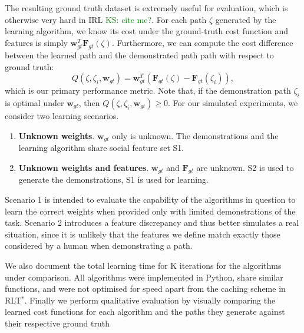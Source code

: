 \documentclass{article}  %
\newcommand{\ks}[1]{\textcolor{green}{KS: #1}}
\begin{document}
	The resulting ground truth dataset is extremely useful for evaluation, which is otherwise very hard in IRL \ks{cite me?}. For each path $\zeta$ generated by the learning algorithm, we know its cost under the ground-truth cost function and features is simply  $\mathbf{w}_{gt}^T\mathbf{F}_{gt}(\zeta)$. Furthermore, we can compute the cost difference between the learned path and the demonstrated path path with respect to ground truth:
	\begin{equation}
		Q(\zeta,\zeta_i,\mathbf{w}_{gt}) = \mathbf{w}_{gt}^T(\mathbf{F}_{gt}(\zeta)-\mathbf{F}_{gt}(\zeta_i)), \label{eq:obj_eval}
	\end{equation}
which is our primary performance metric.  Note that, if the demonstration path $\zeta_i$ is optimal under $\mathbf{w}_{gt}$, then $Q(\zeta,\zeta_i,\mathbf{w}_{gt}) \geq 0$. For our simulated experiments, we consider two learning scenarios.
\begin{enumerate}
	\item \textbf{Unknown weights}. $\mathbf{w}_{gt}$ only is unknown. The demonstrations and the learning algorithm share social feature set S1.
	\item \textbf{Unknown weights and features}. $\mathbf{w}_{gt}$ and $\mathbf{F}_{gt}$  are unknown. S2 is used to generate the demonstrations, S1 is used for learning.
\end{enumerate}

Scenario 1 is intended to evaluate the capability of the algorithms in question to learn the correct weights when provided only with limited demonstrations of the task. Scenario 2 introduces a feature discrepancy and thus better simulates a real situation, since it is unlikely that the features we define match exactly those considered by a human when demonstrating a path.

We also document the total learning time for K iterations for the algorithms under comparison.  All algorithms were implemented in Python, share similar functions, and were not optimised for speed apart from the caching scheme in RLT$^*$. Finally we perform qualitative evaluation by visually comparing the learned cost functions for each algorithm and the paths they generate against their respective ground truth
\end{document}
